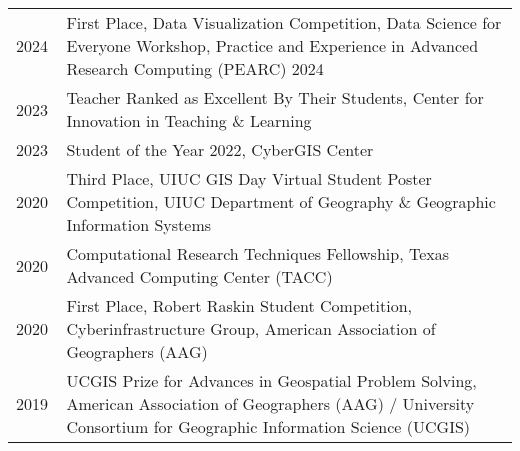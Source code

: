 \documentclass{acmcv}
\begin{document}
    \begin{longtable}{p{0.1\linewidth} p{0.9\linewidth}}

        2024 & First Place, Data Visualization Competition, Data Science for Everyone Workshop, Practice and Experience in Advanced Research Computing (PEARC) 2024 \\

        2023 & Teacher Ranked as Excellent By Their Students,
        Center for Innovation in Teaching \& Learning\\

        2023 & Student of the Year 2022, CyberGIS Center\\

        2020 & Third Place, UIUC GIS Day Virtual Student Poster Competition, UIUC Department of Geography \& Geographic Information Systems \\

        2020 & Computational Research Techniques Fellowship, Texas Advanced Computing Center (TACC)\\

        2020 & First Place, Robert Raskin Student Competition, Cyberinfrastructure Group, American Association of Geographers (AAG) \\

        2019 & UCGIS Prize for Advances in Geospatial Problem Solving, American Association of Geographers (AAG) / University Consortium for Geographic Information Science (UCGIS)  \\





    \end{longtable}
\end{document}
